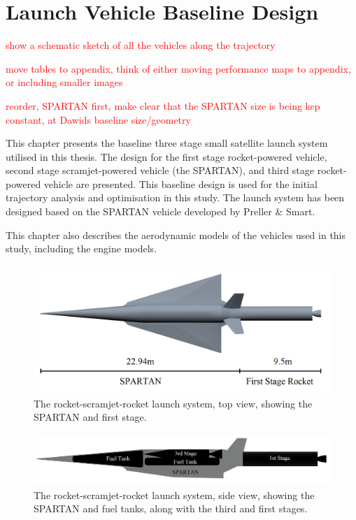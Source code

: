 
\cleardoublepage
\chapter{Launch Vehicle Baseline Design}\label{chapter:methodology}


\textcolor{red}{show a schematic sketch of all the vehicles along the trajectory }


\textcolor{red}{move tables to appendix, think of either moving performance maps to appendix, or including smaller images}


\textcolor{red}{reorder, SPARTAN first, make clear that the SPARTAN size is being kep constant, at Dawids baseline size/geometry}

This chapter presents the baseline three stage small satellite launch system utilised in this thesis. The design for the first stage rocket-powered vehicle, second stage scramjet-powered vehicle (the SPARTAN), and third stage rocket-powered vehicle are presented. This baseline design is used for the initial trajectory analysis and optimisation in this study. The launch system has been designed based on the SPARTAN vehicle developed by Preller \& Smart.

This chapter also describes the aerodynamic models of the vehicles used in this study, including the engine models.


\begin{figure}
\centering
\includegraphics[width=0.7\linewidth]{figures/3_vehicle_design/NoInternal}
\caption{The rocket-scramjet-rocket launch system, top view, showing the SPARTAN and first stage.}
\label{fig:NoInternal}
\end{figure}

\begin{figure}
\centering
\includegraphics[width=0.7\linewidth]{figures/3_vehicle_design/INTERNALS}
\caption{The rocket-scramjet-rocket launch system, side view, showing the SPARTAN and fuel tanks, along with the third and first stages.}
\label{fig:INTERNALS}
\end{figure}


